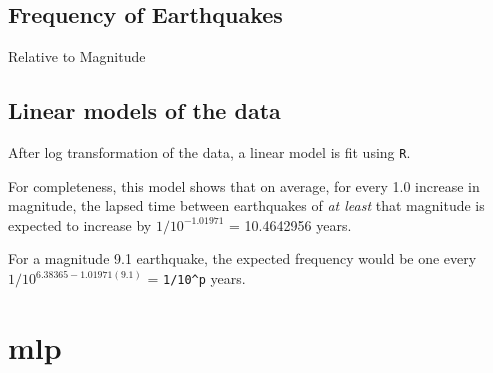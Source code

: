 \documentclass[
]{article}
\newenvironment{Shaded}{\begin{snugshade}}{\end{snugshade}}
\newcommand{\CommentTok}[1]{\textcolor[rgb]{0.56,0.35,0.01}{\textit{#1}}}
\newcommand{\ControlFlowTok}[1]{\textcolor[rgb]{0.13,0.29,0.53}{\textbf{#1}}}
\newcommand{\DecValTok}[1]{\textcolor[rgb]{0.00,0.00,0.81}{#1}}
\newcommand{\FunctionTok}[1]{\textcolor[rgb]{0.00,0.00,0.00}{#1}}
\newcommand{\NormalTok}[1]{#1}
\newcommand{\OtherTok}[1]{\textcolor[rgb]{0.56,0.35,0.01}{#1}}
\newcommand{\SpecialCharTok}[1]{\textcolor[rgb]{0.00,0.00,0.00}{#1}}
\begin{document}
\begin{Shaded}
\end{Shaded}

\hypertarget{frequency-of-earthquakes}{%
\subsection{Frequency of Earthquakes}\label{frequency-of-earthquakes}}

Relative to Magnitude

\hypertarget{linear-models-of-the-data}{%
\subsection{Linear models of the data}\label{linear-models-of-the-data}}

After log transformation of the data, a linear model is fit using
\texttt{R}.

For completeness, this model shows that on average, for every 1.0
increase in magnitude, the lapsed time between earthquakes of \emph{at
least} that magnitude is expected to increase by \(1/10^{-1.01971}\) =
10.4642956 years.

For a magnitude 9.1 earthquake, the expected frequency would be one
every \(1/10^{6.38365-1.01971(9.1)}\) = \texttt{1/10\^{}p} years.

\hypertarget{mlp}{%
\section{mlp}\label{mlp}}
\end{document}
